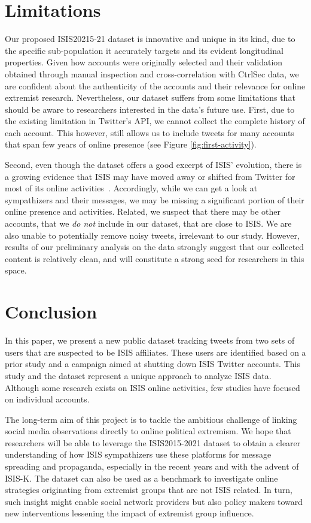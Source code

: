 \documentclass[letterpaper]{article}
\begin{document}
\section{Limitations}
Our proposed ISIS20215-21 dataset  is innovative and unique in its kind, due to the specific sub-population it accurately targets and its evident longitudinal properties. Given how accounts were originally selected and their validation obtained through manual inspection and cross-correlation with CtrlSec data, we are confident about the authenticity of the accounts and their relevance for online extremist research.
Nevertheless, our dataset suffers from some limitations that should be aware to researchers interested in the data's future use.  First,  due to the existing limitation in Twitter's API, we cannot collect the complete history of each account. This however, still allows us  to include tweets for many accounts that span few years of online presence (see Figure \ref{fig:first-activity}).

Second,  even though the dataset offers a good excerpt of ISIS' evolution, there is a growing evidence that ISIS may have moved away or shifted  from Twitter for most of its online activities~\cite{voxpol}. Accordingly, while we can get a look at sympathizers and their messages, we may be missing a significant portion of their online presence and activities. Related, we suspect that there may be  other  accounts, that we \textit{do not }include in our dataset, that are close to ISIS.  We are also unable to potentially remove noisy tweets, irrelevant to our study. However, results of our preliminary analysis on the data strongly suggest that our collected content is relatively clean, and  will constitute a strong  seed    for researchers in this space.




\section{Conclusion}


 In this paper, we present a new public dataset tracking
  tweets from two sets of users that are suspected to be ISIS affiliates. These users are identified based on a prior study and a campaign aimed at shutting down ISIS Twitter accounts.
 This study and the dataset represent a unique approach to analyze ISIS data. Although some research exists on ISIS online activities, few studies have focused on individual accounts.

The long-term aim of this project is to tackle the ambitious challenge of linking social media observations directly
to online political extremism. We hope that researchers will be able to
leverage the ISIS2015-2021 dataset to obtain a clearer understanding  of
how ISIS sympathizers use these platforms for message spreading and propaganda, especially in the recent years and with the advent of ISIS-K.  The dataset can also be used as a benchmark to investigate online strategies   originating from   extremist groups that are  not ISIS related.
 In turn, such insight might enable  social network providers but also policy makers toward new interventions lessening the impact of extremist group influence.
\end{document}
